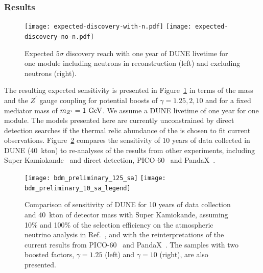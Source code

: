 \subsubsection{Results}

\begin{figure}[!htb]
\centering
\texttt{[image: expected-discovery-with-n.pdf]}\hspace{0.05\textwidth}
\texttt{[image: expected-discovery-no-n.pdf]}
\caption[Expected $5\sigma$ discovery reach with one year of DUNE livetime]{Expected $5\sigma$ discovery reach with one year of DUNE livetime for one \nominalmodsize module including neutrons in reconstruction (left) and excluding neutrons (right).\label{fig:significance}}
\end{figure}
The resulting expected sensitivity is presented in Figure~\ref{fig:significance} in terms of the  mass and the $Z^\prime$ gauge coupling for potential  boosts of $\gamma = 1.25,2,10$ and for a fixed mediator mass of $m_{Z^\prime} = 1~{\rm GeV}$.  We assume a DUNE livetime of one year for one \nominalmodsize module.  The models presented here are currently unconstrained by direct detection searches if the thermal relic abundance of the  is chosen to fit current observations.
Figure~\ref{fig:bdm_sensitivity_comparison} compares the sensitivity of 10 years of data collected in DUNE (40~kton) to re-analyses of the results from other experiments, including Super Kamiokande~\cite{Fechner:2009aa} and  direct detection, PICO-60~\cite{Amole:2019fdf} and PandaX~\cite{Xia:2018qgs}. 

\begin{figure}[!htb]
\centering
\texttt{[image: bdm\_preliminary\_125\_sa]}\hspace{0.05\textwidth}
\texttt{[image: bdm\_preliminary\_10\_sa\_legend]}
\caption[Comparison of DUNE (10 yr) sensitivity to \superk sensitivity]{Comparison of sensitivity of DUNE for 10 years of data collection and 40~kton of detector mass with Super Kamiokande, assuming 10\% and 100\% of the selection efficiency on the atmospheric neutrino analysis in Ref.~\cite{Fechner:2009aa}, and with the reinterpretations of the current results from PICO-60~\cite{Amole:2019fdf} and PandaX~\cite{Xia:2018qgs}.  The samples with two boosted factors, $\gamma = 1.25$ (left) and $\gamma = 10$ (right), are also presented. \label{fig:bdm_sensitivity_comparison}}
\end{figure}

